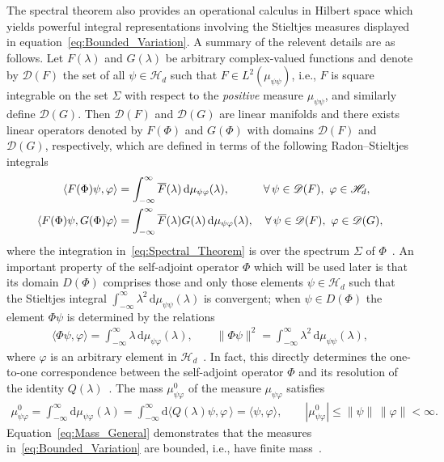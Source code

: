 \documentclass[leqno,onefignum,onetabnum]{siamltex1213}
\renewcommand{\d}{\mathrm{d}}
\newcommand{\Hs}{\mathscr{H}}
\newcommand{\Ds}{\mathscr{D}}
\begin{document}
The spectral theorem also provides an operational calculus in Hilbert
space which yields powerful integral representations involving the
Stieltjes measures displayed in
equation~\eqref{eq:Bounded_Variation}. A summary of the relevent
details are as   
follows. Let $F(\lambda)$ and $G(\lambda)$ be arbitrary complex-valued functions
and denote by $\Ds(F)$ the set of all $\psi\in\Hs_d$ such that
$F\in L^2(\mu_{\psi\psi})$, i.e., $F$ is square integrable on the set
$\Sigma$ with respect to the \emph{positive} measure $\mu_{\psi\psi}$, and similarly define
$\Ds(G)$. Then $\Ds(F)$ and $\Ds(G)$ are linear manifolds and there
exists linear operators denoted by $F(\Phi)$ and $G(\Phi)$ with domains
$\Ds(F)$ and $\Ds(G)$, respectively, which are defined in terms of the
following Radon--Stieltjes integrals~\cite{Stone:64}  
%
\begin{align}\label{eq:Spectral_Theorem}
  \langle F(\Phi)\psi,\varphi\rangle&=\int_{-\infty}^\infty\overline{F}(\lambda)\,\d\mu_{\psi\varphi}(\lambda), \qquad
  \hspace{1em}
  \forall \, \psi\in\mathscr{D}(F), \ \varphi\in\Hs_d,  
  \\
  \langle F(\Phi)\psi,G(\Phi)\varphi\rangle&=\int_{-\infty}^\infty\overline{F}(\lambda)G(\lambda)\,\d\mu_{\psi\varphi}(\lambda),
  \quad
  \forall \, \psi\in\mathscr{D}(F), \ \varphi\in\mathscr{D}(G),
  \notag
\end{align}
%
where the integration in~\eqref{eq:Spectral_Theorem} is over the
spectrum $\Sigma$ of $\Phi$~\cite{Reed-1980,Stone:64}. An important property
of the self-adjoint operator $\Phi$ which will be used later is that its
domain $D(\Phi)$ comprises those and only those elements $\psi\in\Hs_d$ such
that the Stieltjes integral $\int_{-\infty}^\infty\lambda^2\,\d\mu_{\psi\psi}(\lambda)$ is convergent;
when $\psi\in D(\Phi)$ the element $\Phi\psi$ is determined by the relations     
%
\begin{align}\label{eq:X_Q_Correspondence}
  \langle\Phi\psi,\varphi\rangle=\int_{-\infty}^\infty\lambda\,\d\mu_{\psi\varphi}(\lambda), \qquad
  \|\Phi\psi\|^2=\int_{-\infty}^\infty\lambda^2\,\d\mu_{\psi\psi}(\lambda),
\end{align}
%
where $\varphi$ is an arbitrary element in $\Hs_d$~\cite{Stone:64}. In fact,
this directly determines the one-to-one correspondence between the
self-adjoint operator $\Phi$ and its resolution of the identity
$Q(\lambda)$~\cite{Stone:64}. The mass $\mu^0_{\psi\varphi}$ of the measure
$\mu_{\psi\varphi}$ satisfies
% 
\begin{align}\label{eq:Mass_General}
  \mu^0_{\psi\varphi}=\int_{-\infty}^\infty\d\mu_{\psi\varphi}(\lambda)=\int_{-\infty}^\infty\d\langle Q(\lambda)\psi,\varphi\,\rangle=\langle\psi,\varphi\rangle,
  \qquad
  |\mu^0_{\psi\varphi}|\leq\|\psi\|\,\|\varphi\|<\infty.
\end{align}
%
Equation~\eqref{eq:Mass_General} demonstrates that the measures
in~\eqref{eq:Bounded_Variation} are bounded, i.e., have finite
mass~\cite{Stone:64}.  
\end{document}
